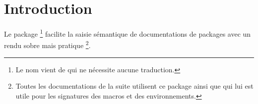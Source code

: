 \documentclass[12pt,a4paper]{article}
\begin{document}
\section{Introduction}

Le package 
\footnote{
	Le nom vient de  qui ne nécessite aucune traduction.
}
facilite la saisie sémantique de documentations de packages avec un rendu sobre mais pratique
\footnote{
	Toutes les documentations de la suite  utilisent ce package ainsi que  qui lui est utile pour les signatures des macros et des environnements.
}.
\end{document}
